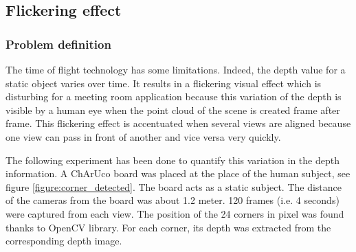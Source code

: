 \subsection{Flickering effect}

\subsubsection{Problem definition}

The time of flight technology has some limitations. Indeed, the depth value for a static object varies over time. It results in a flickering visual effect which is disturbing for a meeting room application because this variation of the depth is visible by a human eye when the point cloud of the scene is created frame after frame. This flickering effect is accentuated when several views are aligned because one view can pass in front of another and vice versa very quickly.

The following experiment has been done to quantify this variation in the depth information. A ChArUco board was placed at the place of the human subject, see figure \ref{figure:corner_detected}. The board acts as a static subject. The distance of the cameras from the board was about 1.2 meter. 120 frames (i.e. 4 seconds) were captured from each view. The position of the 24 corners in pixel was found thanks to OpenCV library. For each corner, its depth was extracted from the corresponding depth image.


